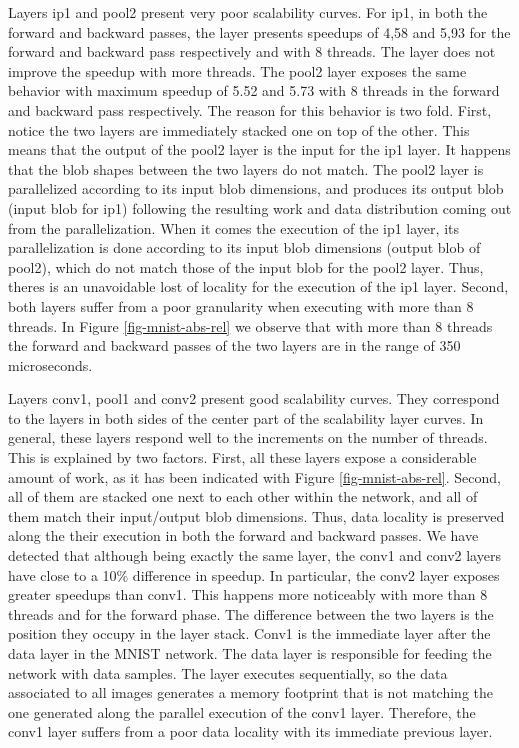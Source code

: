 Layers ip1 and pool2 present very poor scalability curves. 
For ip1, in both the forward and backward passes, the layer 
presents speedups of 4,58 and 5,93 for the forward and backward 
pass respectively and with 8 threads. The layer does not improve 
the speedup with more threads. The pool2 layer exposes the same 
behavior with maximum speedup of 5.52 and 5.73 with 8 threads in 
the forward and backward pass respectively. The reason for this 
behavior is two fold. First, notice the two layers are immediately 
stacked one on top of the other. This means that the 
output of the pool2 layer is the input for the ip1 layer. It happens 
that the blob shapes between the two layers do not match. The pool2 
layer is parallelized according to its input blob dimensions, and 
produces its output blob (input blob for ip1) following the resulting 
work and data distribution coming out from the parallelization. When 
it comes the execution of the ip1 layer, its parallelization is done 
according to its input blob dimensions (output blob of pool2), which do 
not match those of the input blob for the pool2 layer. Thus, theres is 
an unavoidable lost of locality for the execution of the ip1 layer. 
Second, both layers suffer from a poor granularity when executing with 
more than 8 threads. In Figure \ref{fig-mnist-abs-rel} we observe that 
with more than 8 threads the forward and backward passes of the two layers 
are in the range of 350 microseconds.

Layers conv1, pool1 and conv2 present good scalability curves. They 
correspond to the layers in both sides of the center part of the 
scalability layer curves. In general, these layers respond well to the 
increments on the number of threads. This is explained by two factors. 
First, all these layers expose a considerable amount of work, as it has 
been indicated with Figure \ref{fig-mnist-abs-rel}. Second, all of them 
are stacked one next to each other within the network, and all of them 
match their input/output blob dimensions. Thus, data locality is 
preserved along the their execution in both the forward and backward passes.
We have detected that although being exactly the same layer, the conv1 
and conv2 layers have close to a 10\% difference in speedup. 
In particular, the conv2 layer exposes greater speedups than conv1. 
This happens more noticeably with more than 8 threads and for the 
forward phase. The difference between the two layers is the position 
they occupy in the layer stack. Conv1 is the immediate layer after the 
data layer in the MNIST network. The data layer is responsible for
feeding the network with data samples. The layer executes sequentially, 
so the data associated to all images generates a memory footprint that is 
not matching the one generated along the parallel execution of the 
conv1 layer. Therefore, the conv1 layer suffers from a poor data 
locality with its immediate previous layer.

